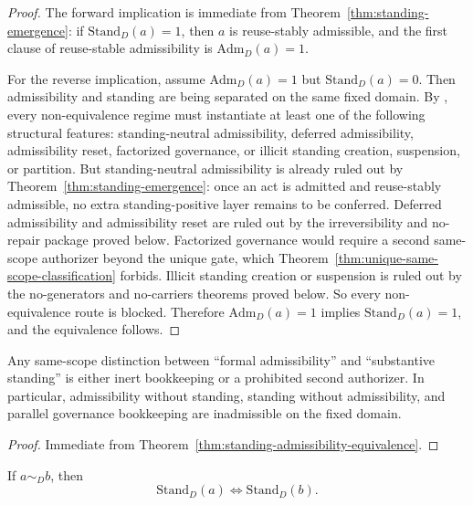 \begin{proof}
The forward implication is immediate from Theorem~\ref{thm:standing-emergence}: if $\mathrm{Stand}_D(a)=1$, then $a$ is reuse-stably admissible, and the first clause of reuse-stable admissibility is $\mathrm{Adm}_D(a)=1$.

For the reverse implication, assume $\mathrm{Adm}_D(a)=1$ but $\mathrm{Stand}_D(a)=0$. Then admissibility and standing are being separated on the same fixed domain. By \standeqdoc{}, every non-equivalence regime must instantiate at least one of the following structural features: standing-neutral admissibility, deferred admissibility, admissibility reset, factorized governance, or illicit standing creation, suspension, or partition. But standing-neutral admissibility is already ruled out by Theorem~\ref{thm:standing-emergence}: once an act is admitted and reuse-stably admissible, no extra standing-positive layer remains to be conferred. Deferred admissibility and admissibility reset are ruled out by the irreversibility and no-repair package proved below. Factorized governance would require a second same-scope authorizer beyond the unique gate, which Theorem~\ref{thm:unique-same-scope-classification} forbids. Illicit standing creation or suspension is ruled out by the no-generators and no-carriers theorems proved below. So every non-equivalence route is blocked. Therefore $\mathrm{Adm}_D(a)=1$ implies $\mathrm{Stand}_D(a)=1$, and the equivalence follows.\cite{MaleyNecessity,MaleyStandingEquivalence}
\end{proof}

\begin{corollary}
\label{cor:no-dual-track-governance}
Any same-scope distinction between ``formal admissibility'' and ``substantive standing'' is either inert bookkeeping or a prohibited second authorizer. In particular, admissibility without standing, standing without admissibility, and parallel governance bookkeeping are inadmissible on the fixed domain.
\end{corollary}

\begin{proof}
Immediate from Theorem~\ref{thm:standing-admissibility-equivalence}.\cite{MaleyStandingEquivalence}
\end{proof}

\begin{corollary}
If $a\sim_D b$, then
\[
\mathrm{Stand}_D(a) \iff \mathrm{Stand}_D(b).
\]
\end{corollary}

